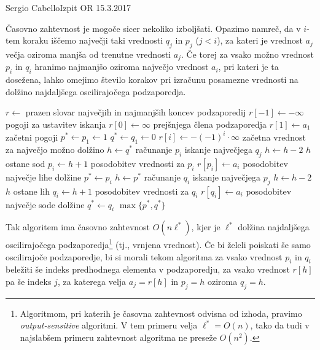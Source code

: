 \begin{naloga}{Sergio Cabello}{Izpit OR 15.3.2017}
\begin{odgovor}
Časovno zahtevnost je mogoče sicer nekoliko izboljšati.
Opazimo namreč, da v $i$-tem koraku
iščemo največji taki vrednosti $q_j$ in $p_j$ ($j < i$),
za kateri je vrednost $a_j$ večja oziroma manjša od trenutne vrednosti $a_j$.
Če torej za vsako možno vrednost $p_i$ in $q_i$
hranimo najmanjšo oziroma največjo vrednost $a_i$,
pri kateri je ta dosežena,
lahko omejimo število korakov pri izračunu posamezne vrednosti
na dolžino najdaljšega oscilirajočega podzaporedja.
\begin{small}
\begin{algorithmic}
	\State $r \gets$ prazen slovar največjih in najmanjših koncev podzaporedij
	\State $r[-1] \gets -\infty$ \hfill pogoji za ustavitev iskanja
	\State $r[0] \gets \infty$ \hfill prejšnjega člena podzaporedja
	\State $r[1] \gets a_1$ \hfill začetni pogoji
	\State $p^* \gets p_1 \gets 1$
	\State $q^* \gets q_1 \gets 0$
		\State $r[i] \gets -(-1)^i \cdot \infty$
			\hfill začetna vrednost za največjo možno dolžino
		\State $h \gets q^*$ \hfill računanje $p_i$
		 \hfill iskanje največjega $q_j$
			\State $h \gets h - 2$ \hfill $h$ ostane sod
		\EndWhile
		\State $p_i \gets h + 1$
		 \hfill posodobitev vrednosti za $p_i$
			\State $r[p_i] \gets a_i$
		\EndIf
		 \hfill posodobitev največje lihe dolžine
			\State $p^* \gets p_i$
		\EndIf
		\State $h \gets p^*$ \hfill računanje $q_i$
		 \hfill iskanje največjega $p_j$
			\State $h \gets h - 2$ \hfill $h$ ostane lih
		\EndWhile
		\State $q_i \gets h + 1$
		 \hfill posodobitev vrednosti za $q_i$
			\State $r[q_i] \gets a_i$
		\EndIf
		 \hfill posodobitev največje sode dolžine
			\State $q^* \gets q_i$
		\EndIf
	\EndFor
	\State \Return $\max\{p^*, q^*\}$
\EndFunction
\end{algorithmic}
\end{small}
Tak algoritem ima časovno zahtevnost $O(n\ell^*)$,
kjer je $\ell^*$ dolžina najdaljšega oscilirajočega podzaporedja\footnote{%
Algoritmom, pri katerih je časovna zahtevnost odvisna od izhoda,
pravimo {\em output-sensitive} algoritmi.
V tem primeru velja $\ell^* = O(n)$,
tako da tudi v najslabšem primeru zahtevnost algoritma ne preseže $O(n^2)$.%
}
(tj., vrnjena vrednost).
Če bi želeli poiskati še samo oscilirajoče podzaporedje,
bi si morali tekom algoritma za vsako vrednost $p_i$ in $q_i$
beležiti še indeks predhodnega elementa v podzaporedju,
za vsako vrednost $r[h]$ pa še indeks $j$,
za katerega velja $a_j = r[h]$ in $p_j = h$ oziroma $q_j = h$.
\end{odgovor}
\end{naloga}
